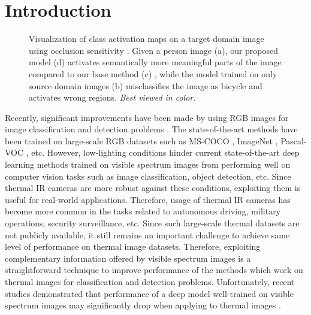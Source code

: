 \documentclass[final]{cvpr}
\begin{document}
\section{Introduction}

\begin{figure}[t]
\centering
    \vspace{3mm}
    \caption{Visualization of class activation maps on a target domain image using occlusion sensitivity \cite{zeiler2014visualizing}. Given a person image (a), our proposed model (d) activates semantically more meaningful parts of the image compared to our base method (c) \cite{adda}, while the model trained on only source domain images (b) misclassifies the image as bicycle and activates wrong regions.  \textit{Best viewed in color}.}
    \label{fig:activation_maps}
\end{figure}

Recently, significant improvements have been made by using RGB images for image classification and detection problems \cite{rcnn, resnet, alexnet, yolo, fasterrcnn}. The state-of-the-art methods have been trained on large-scale RGB datasets such as MS-COCO \cite{mscoco}, ImageNet \cite{imagenet_cvpr09}, Pascal-VOC \cite{pascalvoc}, etc. However, low-lighting conditions hinder current state-of-the-art deep learning methods trained on visible spectrum images from performing well on computer vision tasks such as image classification, object detection, etc. Since thermal IR cameras are more robust against these conditions, exploiting them is useful for real-world applications. Therefore, usage of thermal IR cameras has become more common in the tasks related to autonomous driving, military operations, security surveillance, etc. Since such large-scale thermal datasets are not publicly available, it still remains an important challenge to achieve same level of performance on thermal image datasets. Therefore, exploiting complementary information offered by visible spectrum images is a straightforward technique to improve performance of the methods which work on thermal images for classification and detection problems. Unfortunately, recent studies demonstrated that performance of a deep model well-trained on visible spectrum images may significantly drop when applying to thermal images \cite{devaguptapu2019borrow, guan2019unsupervised, guo2019domain, kaist, BMVC2016_73}. 
\end{document}

